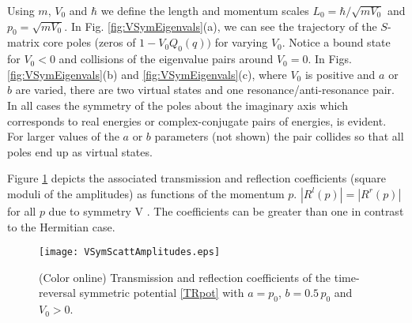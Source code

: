 Using $m$, $V_0$ and $\hbar$ we define the length and momentum scales $L_0 = \hbar/\sqrt{mV_0}$ and $p_0 = \sqrt{mV_0}$. In Fig. \ref{fig:VSymEigenvals}(a), we can see the trajectory of the $S$-matrix core poles (zeros
of $1-V_0Q_0(q))$ for varying $V_0$. Notice a bound state for $V_0<0$ and collisions of the eigenvalue pairs around $V_0 = 0$. In Figs. \ref{fig:VSymEigenvals}(b) and \ref{fig:VSymEigenvals}(c), where $V_0$ is positive and $a$ or $b$ are varied,
there are two virtual states and one resonance/anti-resonance pair. In all cases the symmetry of the poles about the imaginary axis
which corresponds to real energies or complex-conjugate pairs of energies, is evident. For larger values of the $a$ or $b$ parameters
(not shown)
the pair collides so that all poles end up as virtual states.

Figure \ref{fig:VSymScattAmplitudes} depicts the associated transmission and reflection coefficients (square moduli of the amplitudes) as functions of the momentum $p$. $|R^l(p)|=|R^r(p)|$ for all $p$ due to symmetry V \cite{Ruschhaupt2017}.
The coefficients can be greater than one in contrast to the Hermitian case.

\begin{figure}
    \begin{center}
    \texttt{[image: VSymScattAmplitudes.eps]}
    \end{center}
    \caption{(Color online) Transmission and reflection coefficients of the time-reversal symmetric potential \eqref{TRpot} with $a=p_0$, $b= 0.5\, p_0$ and $V_0>0$.}
    \label{fig:VSymScattAmplitudes}
\end{figure}

%
